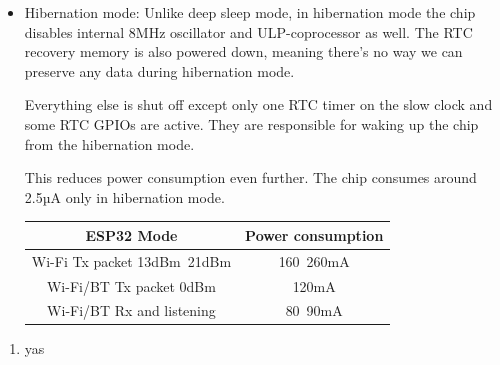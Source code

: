 \documentclass[a4paper ,12pt, onecolumn]{article}
\begin{document}
\begin{itemize}
                \item Hibernation mode: Unlike deep sleep mode, in hibernation mode the chip disables internal 8MHz oscillator and ULP-coprocessor as well. The RTC recovery memory is also powered down, meaning there’s no way we can preserve any data during hibernation mode.
            
                Everything else is shut off except only one RTC timer on the slow clock and some RTC GPIOs are active. They are responsible for waking up the chip from the hibernation mode.
                
                This reduces power consumption even further. The chip consumes around 2.5µA only in hibernation mode.
            
                \begin{center}
                    \begin{tabular}{||c | c ||} 
                    \hline
                    ESP32 Mode & Power consumption  \\ [0.5ex] 
                    \hline\hline
                    Wi-Fi Tx packet 13dBm~21dBm & 160~260mA  \\ 
                    \hline
                    Wi-Fi/BT Tx packet 0dBm	 & 120mA  \\
                    \hline
                    Wi-Fi/BT Rx and listening & 80~90mA  \\
                    \hline
                \end{tabular}
                \end{center}
            \end{itemize}
            \begin{enumerate}
                \item  yas
            \end{enumerate}
\end{document}
